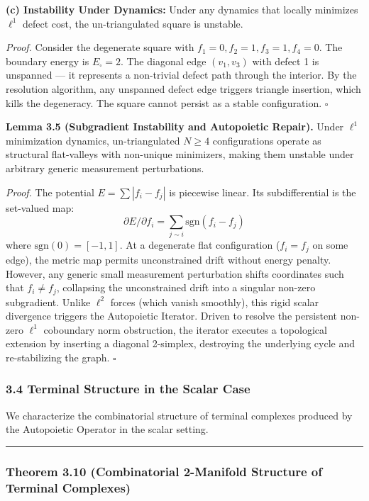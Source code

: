 \documentclass[
]{article}
\begin{document}
\textbf{(c) Instability Under Dynamics:} Under any dynamics that locally
minimizes \(\ell^1\) defect cost, the un-triangulated square is
unstable.

\emph{Proof.} Consider the degenerate square with
\(f_1 = 0, f_2 = 1, f_3 = 1, f_4 = 0\). The boundary energy is
\(E_{\square} = 2\). The diagonal edge \((v_1, v_3)\) with defect 1 is
unspanned --- it represents a non-trivial defect path through the
interior. By the resolution algorithm, any unspanned defect edge
triggers triangle insertion, which kills the degeneracy. The square
cannot persist as a stable configuration. \(\square\)

\textbf{Lemma 3.5 (Subgradient Instability and Autopoietic Repair).}
Under \(\ell^1\) minimization dynamics, un-triangulated \(N \geq 4\)
configurations operate as structural flat-valleys with non-unique
minimizers, making them unstable under arbitrary generic measurement
perturbations.

\emph{Proof.} The potential \(E = \sum |f_i - f_j|\) is piecewise
linear. Its subdifferential is the set-valued map:
\[\partial E / \partial f_i = \sum_{j \sim i} \text{sgn}(f_i - f_j)\]
where \(\text{sgn}(0) = [-1, 1]\). At a degenerate flat configuration
(\(f_i = f_j\) on some edge), the metric map permits unconstrained drift
without energy penalty. However, any generic small measurement
perturbation shifts coordinates such that \(f_i \neq f_j\), collapsing
the unconstrained drift into a singular non-zero subgradient. Unlike
\(\ell^2\) forces (which vanish smoothly), this rigid scalar divergence
triggers the Autopoietic Iterator. Driven to resolve the persistent
non-zero \(\ell^1\) coboundary norm obstruction, the iterator executes a
topological extension by inserting a diagonal 2-simplex, destroying the
underlying cycle and re-stabilizing the graph. \(\square\)

\subsubsection{3.4 Terminal Structure in the Scalar
Case}\label{terminal-structure-in-the-scalar-case}

We characterize the combinatorial structure of terminal complexes
produced by the Autopoietic Operator in the scalar setting.

\begin{center}\rule{0.5\linewidth}{0.5pt}\end{center}

\subsubsection{Theorem 3.10 (Combinatorial 2-Manifold Structure of
Terminal
Complexes)}\label{theorem-3.10-combinatorial-2-manifold-structure-of-terminal-complexes}
\end{document}
